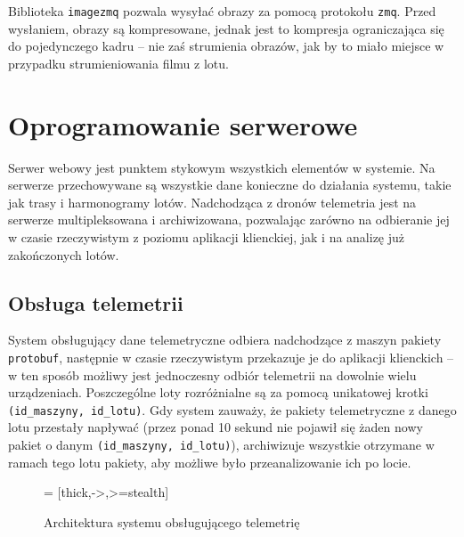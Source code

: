 Biblioteka \texttt{imagezmq} pozwala wysyłać obrazy za pomocą protokołu \texttt{zmq}.
Przed wysłaniem, obrazy są kompresowane, jednak jest to kompresja ograniczająca się do 
pojedynczego kadru -- nie zaś strumienia obrazów, jak by to miało miejsce w przypadku 
strumieniowania filmu z lotu.

\section{Oprogramowanie serwerowe}

Serwer webowy jest punktem stykowym wszystkich elementów w systemie.
Na serwerze przechowywane są wszystkie dane konieczne do działania systemu, takie jak
trasy i harmonogramy lotów. Nadchodząca z dronów telemetria jest na 
serwerze multipleksowana i archiwizowana, pozwalając zarówno na odbieranie jej
w czasie rzeczywistym z poziomu aplikacji klienckiej, jak i na analizę już zakończonych lotów.

\subsection{Obsługa telemetrii}

System obsługujący dane telemetryczne odbiera nadchodzące z maszyn pakiety
\texttt{protobuf}, następnie w czasie rzeczywistym przekazuje je do aplikacji klienckich 
-- w ten sposób możliwy jest jednoczesny odbiór telemetrii na dowolnie wielu urządzeniach.
Poszczególne loty rozróżnialne są za pomocą unikatowej krotki
\texttt{(id\_maszyny, id\_lotu)}. Gdy system zauważy, że pakiety telemetryczne z danego
lotu przestały napływać (przez ponad 10 sekund nie pojawił się żaden nowy pakiet o danym
\texttt{(id\_maszyny, id\_lotu)}), archiwizuje wszystkie otrzymane w ramach tego lotu
pakiety, aby możliwe było przeanalizowanie ich po locie.


\begin{figure}[H]
	\centering\small
	\caption{
	 Architektura systemu obsługującego telemetrię 
	}
	\label{telemetry_backend_architecture}
	\hspace{-1.2cm}
 = [thick,->,>=stealth]
\end{figure}

